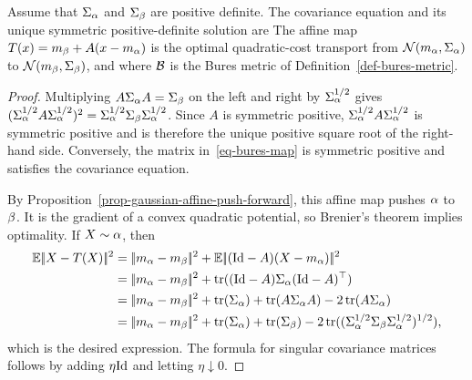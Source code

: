 \begin{prop}\label{prop-gaussian-w2-bures}
	Assume that $\Sigma_\alpha$ and $\Sigma_\beta$ are positive definite. The covariance equation and its unique symmetric positive-definite solution are
	The affine map $T(x)=m_\beta+A(x-m_\alpha)$ is the optimal quadratic-cost transport from $\mathcal{N}(m_\alpha,\Sigma_\alpha)$ to $\mathcal{N}(m_\beta,\Sigma_\beta)$, and
	where $\mathcal{B}$ is the Bures metric of Definition~\ref{def-bures-metric}.
\end{prop}
\begin{proof}
	Multiplying $A\Sigma_\alpha A=\Sigma_\beta$ on the left and right by $\Sigma_\alpha^{1/2}$ gives
	$(\Sigma_\alpha^{1/2}A\Sigma_\alpha^{1/2})^2
	=\Sigma_\alpha^{1/2}\Sigma_\beta\Sigma_\alpha^{1/2}$.
	Since $A$ is symmetric positive, $\Sigma_\alpha^{1/2}A\Sigma_\alpha^{1/2}$ is symmetric positive and is therefore the unique positive square root of the right-hand side. Conversely, the matrix in~\eqref{eq-bures-map} is symmetric positive and satisfies the covariance equation.

	By Proposition~\ref{prop-gaussian-affine-push-forward}, this affine map pushes $\alpha$ to $\beta$. It is the gradient of a convex quadratic potential, so Brenier's theorem implies optimality. If $X\sim\alpha$, then
	\begin{align*}
		\EE\norm{X-\T(X)}^2
		&=
		\norm{\mean_\al-\mean_\be}^2
		+
		\EE\norm{(\Id-A)(X-\mean_\al)}^2 \\
		&=
		\norm{\mean_\al-\mean_\be}^2
		+
		\tr((\Id-A)\cov_\al(\Id-A)^\top) \\
		&=
		\norm{\mean_\al-\mean_\be}^2
		+
		\tr(\cov_\al)+\tr(A\cov_\al A)-2\tr(A\cov_\al) \\
		&=
		\norm{\mean_\al-\mean_\be}^2
		+
		\tr(\cov_\al)+\tr(\cov_\be)
		-2\tr((\cov_\al^{1/2}\cov_\be\cov_\al^{1/2})^{1/2}),
	\end{align*}
	which is the desired expression. The formula for singular covariance matrices follows by adding $\eta\mathrm{Id}$ and letting $\eta\downarrow0$.
\end{proof}

